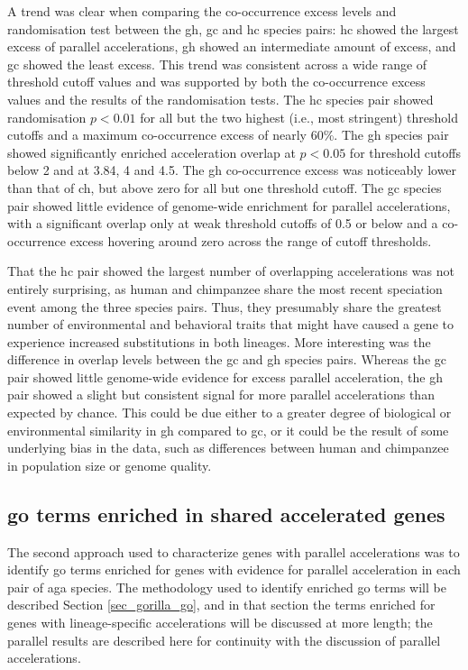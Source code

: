 A trend was clear when comparing the co-occurrence excess levels and
randomisation test \pvs between the \ac{gh}, \ac{gc} and \ac{hc}
species pairs: \ac{hc} showed the largest excess of parallel
accelerations, \ac{gh} showed an intermediate amount of excess, and
\ac{gc} showed the least excess. This trend was consistent across a
wide range of threshold cutoff values and was supported by both the
co-occurrence excess values and the results of the randomisation
tests. The \ac{hc} species pair showed randomisation $p<0.01$ for all
but the two highest (i.e., most stringent) threshold cutoffs and a
maximum co-occurrence excess of nearly 60\%. The \ac{gh} species pair
showed significantly enriched acceleration overlap at $p<0.05$ for
threshold cutoffs below 2 and at 3.84, 4 and 4.5. The \ac{gh}
co-occurrence excess was noticeably lower than that of \ac{ch}, but
above zero for all but one threshold cutoff. The \ac{gc} species pair
showed little evidence of genome-wide enrichment for parallel
accelerations, with a significant overlap only at weak threshold
cutoffs of 0.5 or below and a co-occurrence excess hovering around
zero across the range of cutoff thresholds.

That the \ac{hc} pair showed the largest number of overlapping
accelerations was not entirely surprising, as human and chimpanzee
share the most recent speciation event among the three species
pairs. Thus, they presumably share the greatest number of
environmental and behavioral traits that might have caused a gene to
experience increased \nsyn substitutions in both lineages. More
interesting was the difference in overlap levels between the \ac{gc}
and \ac{gh} species pairs. Whereas the \ac{gc} pair showed little
genome-wide evidence for excess parallel acceleration, the \ac{gh}
pair showed a slight but consistent signal for more parallel
accelerations than expected by chance. This could be due either to a
greater degree of biological or environmental similarity in \ac{gh}
compared to \ac{gc}, or it could be the result of some underlying bias
in the data, such as differences between human and chimpanzee in
population size or genome quality.

\subsection{\ac{go} terms enriched in shared accelerated genes}

The second approach used to characterize genes with parallel
accelerations was to identify \ac{go} terms enriched for genes with
evidence for parallel acceleration in each pair of \ac{aga}
species. The methodology used to identify enriched \ac{go} terms will
be described Section \ref{sec_gorilla_go}, and in that section the
terms enriched for genes with lineage-specific accelerations will be
discussed at more length; the parallel results are described here for
continuity with the discussion of parallel accelerations.

